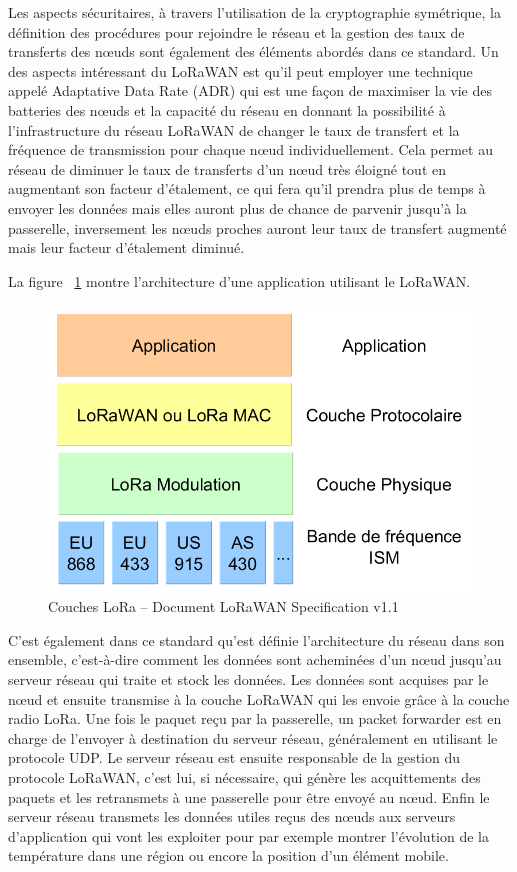 Les aspects sécuritaires, à travers l’utilisation de la cryptographie symétrique, la définition des procédures pour rejoindre le réseau et la gestion des taux de transferts des nœuds sont également des éléments abordés dans ce standard. Un des aspects intéressant du LoRaWAN est qu’il peut employer une technique appelé Adaptative Data Rate (ADR) qui est une façon de maximiser la vie des batteries des nœuds et la capacité du réseau en donnant la possibilité à l’infrastructure du réseau LoRaWAN de changer le taux de transfert et la fréquence de transmission pour chaque nœud individuellement. Cela permet au réseau de diminuer le taux de transferts d’un nœud très éloigné tout en augmentant son facteur d’étalement, ce qui fera qu’il prendra plus de temps à envoyer les données mais elles auront plus de chance de parvenir jusqu’à la passerelle, inversement les nœuds proches auront leur taux de transfert augmenté mais leur facteur d’étalement diminué.

La figure ~\ref{fig:layers_lorawan}  montre l’architecture d’une application utilisant le LoRaWAN.

\begin{figure}[htb]
\centering 
\includegraphics[width=0.7\columnwidth]{../images/lora_layers.png} 
\caption[Couches LoRa]{Couches LoRa – Document LoRaWAN Specification v1.1}
\label{fig:layers_lorawan}
\end{figure}

C’est également dans ce standard qu’est définie l’architecture du réseau dans son ensemble, c’est-à-dire comment les données sont acheminées d’un nœud jusqu’au serveur réseau qui traite et stock les données. Les données sont acquises par le nœud et ensuite transmise à la couche LoRaWAN qui les envoie grâce à la couche radio LoRa. Une fois le paquet reçu par la passerelle, un packet forwarder est en charge de l’envoyer à destination du serveur réseau, généralement en utilisant le protocole UDP. Le serveur réseau est ensuite responsable de la gestion du protocole LoRaWAN, c’est lui, si nécessaire, qui génère les acquittements des paquets et les retransmets à une passerelle pour être envoyé au nœud. Enfin le serveur réseau transmets les données utiles reçus des nœuds aux serveurs d’application qui vont les exploiter pour par exemple montrer l’évolution de la température dans une région ou encore la position d’un élément mobile. \cite{lorawan_spec}

